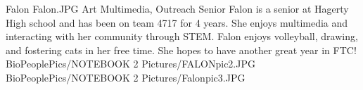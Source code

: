 \insertbio
{Falon}
{Falon.JPG}
{Art}
{Multimedia, Outreach}
{Senior}
{
Falon is a senior at Hagerty High school and has been on team 4717 for 4 years. She enjoys multimedia and interacting with her community through STEM. Falon enjoys volleyball, drawing, and fostering cats in her free time. She hopes to have another great year in FTC!
}
{BioPeoplePics/NOTEBOOK 2 Pictures/FALONpic2.JPG}
{BioPeoplePics/NOTEBOOK 2 Pictures/Falonpic3.JPG}
